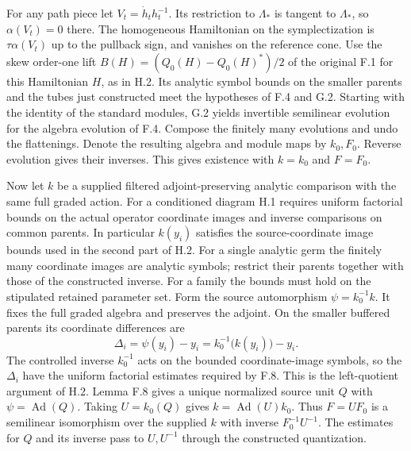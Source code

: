\documentclass[
  english,
  11pt,
  reqno]{amsart}
\begin{document}
For any path piece let \(V_t=\dot h_t h_t^{-1}\). Its restriction to
\(\Lambda_*\) is tangent to \(\Lambda_*\), so \(\alpha(V_t)=0\) there.
The homogeneous Hamiltonian on the symplectization is
\(\tau\alpha(V_t)\) up to the pullback sign, and vanishes on the
reference cone. Use the skew order-one lift \(B(H)=(Q_0(H)-Q_0(H)^*)/2\)
of the original F.1 for this Hamiltonian \(H\), as in H.2. Its analytic
symbol bounds on the smaller parents and the tubes just constructed meet
the hypotheses of F.4 and G.2. Starting with the identity of the
standard modules, G.2 yields invertible semilinear evolution for the
algebra evolution of F.4. Compose the finitely many evolutions and undo
the flattenings. Denote the resulting algebra and module maps by
\(k_0,F_0\). Reverse evolution gives their inverses. This gives
existence with \(k=k_0\) and \(F=F_0\).

Now let \(k\) be a supplied filtered adjoint-preserving analytic
comparison with the same full graded action. For a conditioned diagram
H.1 requires uniform factorial bounds on the actual operator coordinate
images and inverse comparisons on common parents. In particular
\(k(y_i)\) satisfies the source-coordinate image bounds used in the
second part of H.2. For a single analytic germ the finitely many
coordinate images are analytic symbols; restrict their parents together
with those of the constructed inverse. For a family the bounds must hold
on the stipulated retained parameter set. Form the source automorphism
\(\psi=k_0^{-1}k\). It fixes the full graded algebra and preserves the
adjoint. On the smaller buffered parents its coordinate differences are
\[
\Delta_i=\psi(y_i)-y_i=k_0^{-1}\bigl(k(y_i)\bigr)-y_i .
\] The controlled inverse \(k_0^{-1}\) acts on the bounded
coordinate-image symbols, so the \(\Delta_i\) have the uniform factorial
estimates required by F.8. This is the left-quotient argument of H.2.
Lemma F.8 gives a unique normalized source unit \(Q\) with
\(\psi=\operatorname{Ad}(Q)\). Taking \(U=k_0(Q)\) gives
\(k=\operatorname{Ad}(U)k_0\). Thus \(F=UF_0\) is a semilinear
isomorphism over the supplied \(k\) with inverse \(F_0^{-1}U^{-1}\). The
estimates for \(Q\) and its inverse pass to \(U,U^{-1}\) through the
constructed quantization.
\end{document}
